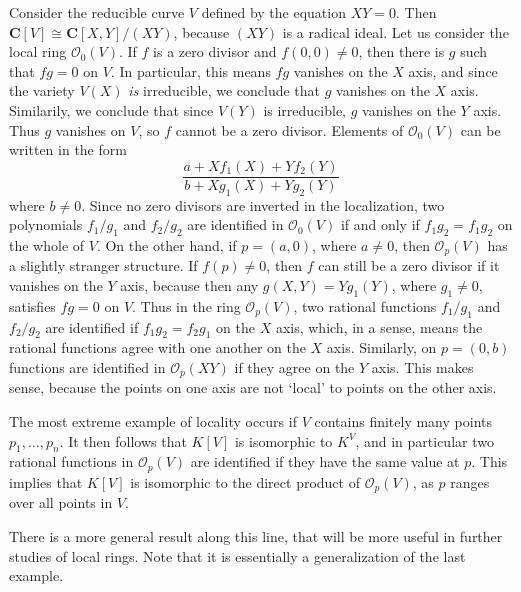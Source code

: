 \begin{example}
    Consider the reducible curve $V$ defined by the equation $XY = 0$. Then $\mathbf{C}[V] \cong \mathbf{C}[X,Y]/(XY)$, because $(XY)$ is a radical ideal. Let us consider the local ring $\mathcal{O}_0(V)$. If $f$ is a zero divisor and $f(0,0) \neq 0$, then there is $g$ such that $fg = 0$ on $V$. In particular, this means $fg$ vanishes on the $X$ axis, and since the variety $V(X)$ {\it is} irreducible, we conclude that $g$ vanishes on the $X$ axis. Similarily, we conclude that since $V(Y)$ is irreducible, $g$ vanishes on the $Y$ axis. Thus $g$ vanishes on $V$, so $f$ cannot be a zero divisor. Elements of $\mathcal{O}_0(V)$ can be written in the form
    \[ \frac{a + Xf_1(X) + Yf_2(Y)}{b + Xg_1(X) + Yg_2(Y)} \]
    where $b \neq 0$. Since no zero divisors are inverted in the localization, two polynomials $f_1/g_1$ and $f_2/g_2$ are identified in $\mathcal{O}_0(V)$ if and only if $f_1g_2 = f_1g_2$ on the whole of $V$. On the other hand, if $p = (a,0)$, where $a \neq 0$, then $\mathcal{O}_p(V)$ has a slightly stranger structure. If $f(p) \neq 0$, then $f$ can still be a zero divisor if it vanishes on the $Y$ axis, because then any $g(X,Y) = Yg_1(Y)$, where $g_1 \neq 0$, satisfies $fg = 0$ on $V$. Thus in the ring $\mathcal{O}_p(V)$, two rational functions $f_1/g_1$ and $f_2/g_2$ are identified if $f_1g_2 = f_2g_1$ on the $X$ axis, which, in a sense, means the rational functions agree with one another on the $X$ axis. Similarly, on $p = (0,b)$ functions are identified in $\mathcal{O}_p(XY)$ if they agree on the $Y$ axis. This makes sense, because the points on one axis are not `local' to points on the other axis.
\end{example}

\begin{example}
    The most extreme example of locality occurs if $V$ contains finitely many points $p_1, \dots, p_n$. It then follows that $K[V]$ is isomorphic to $K^V$, and in particular two rational functions in $\mathcal{O}_p(V)$ are identified if they have the same value at $p$. This implies that $K[V]$ is isomorphic to the direct product of $\mathcal{O}_p(V)$, as $p$ ranges over all points in $V$.
\end{example}

There is a more general result along this line, that will be more useful in further studies of local rings. Note that it is essentially a generalization of the last example.

